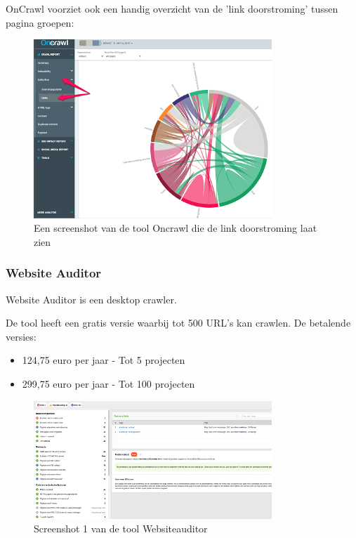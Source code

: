 OnCrawl voorziet ook een handig overzicht van de 'link doorstroming' tussen pagina groepen: 

\begin{figure}[h!]
\centering
\includegraphics[width=0.8\textwidth]{img/oncrawl-link-visualization.png}\caption{Een screenshot van de tool Oncrawl die de link doorstroming laat zien
\autocite{oncrawl}}
\end{figure}

\newpage
\subsubsection{Website Auditor}
\label{ch: Website Auditor}

Website Auditor is een desktop crawler. 

De tool heeft een gratis versie waarbij tot 500 URL's kan crawlen. 
De betalende versies: 
\begin{itemize}
\item 124,75 euro per jaar - Tot 5 projecten
\item 299,75 euro per jaar - Tot 100 projecten
\end{itemize}

\begin{figure}[h!]
\centering
\includegraphics[width=0.8\textwidth]{img/websiteauditor.PNG}
\caption{Screenshot 1 van de tool Websiteauditor
\autocite{websiteauditor}}
\end{figure}

